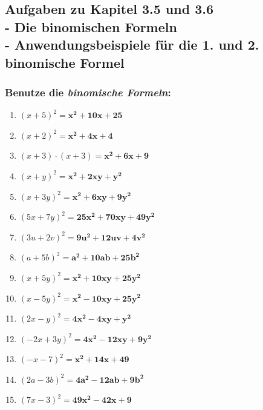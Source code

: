 \documentclass[a4paper,10pt]{article} %
\begin{document}
\subsection{Aufgaben zu Kapitel 3.5 und 3.6 \\
  - Die binomischen Formeln \\
  - Anwendungsbeispiele für die 1. und 2. binomische Formel}

\subsubsection{Benutze die \textit{binomische Formeln}:} %

\begin{enumerate}[label=\alph*)]

  \item \({(x + 5)}^2 =
    \mathbf{x^2 + 10x + 25}\) %

  \item \({(x + 2)}^2 =
    \mathbf{x^2 + 4x + 4}\) %

  \item \((x + 3) \cdot (x + 3) =
    \mathbf{x^2 + 6x + 9}\) %

  \item \({(x + y)}^2 =
    \mathbf{x^2 + 2xy + y^2}\) %

  \item \({(x + 3y)}^2 =
    \mathbf{x^2 + 6xy + 9y^2}\) %

  \item \({(5x + 7y)}^2 =
    \mathbf{25x^2 + 70xy + 49y^2}\) %

  \item \({(3u + 2v)}^2 =
    \mathbf{9u^2 + 12uv + 4v^2}\) %

  \item \({(a + 5b)}^2 =
    \mathbf{a^2 + 10ab + 25b^2}\) %

  \item \({(x + 5y)}^2 =
    \mathbf{x^2 + 10xy + 25y^2}\) %

  \item \({(x - 5y)}^2 =
    \mathbf{x^2 - 10xy + 25y^2}\) %

  \item \({(2x - y)}^2 =
    \mathbf{4x^2 - 4xy + y^2}\) %

  \item \({(-2x + 3y)}^2 =
    \mathbf{4x^2 - 12xy + 9y^2}\) %

  \item \({(-x - 7)}^2 =
    \mathbf{x^2 + 14x + 49}\) %

  \item \({(2a - 3b)}^2 =
    \mathbf{4a^2 - 12ab + 9b^2}\) %

  \item \({(7x - 3)}^2 =
    \mathbf{49x^2 - 42x + 9}\) %

\end{enumerate}
\end{document}
